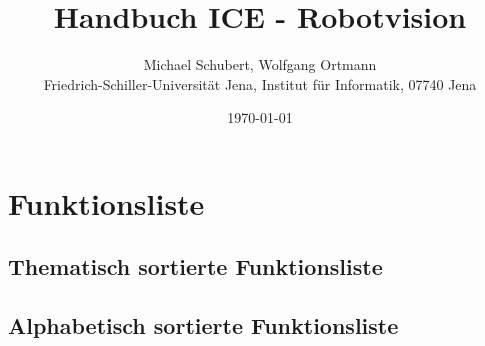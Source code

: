 \documentclass[10pt,titlepage]{article}
\begin{document}
\title{Handbuch ICE - Robotvision}
\author{Michael Schubert, Wolfgang Ortmann\\
Friedrich-Schiller-Universität Jena, Institut für Informatik, 07740 Jena}
\date{\today}
\maketitle

\tableofcontents
\newpage

\newpage

\newpage

\newpage

\newpage

\newpage

\newpage

\newpage

\newpage

\newpage

\newpage

\section{Funktionsliste}
\subsection{Thematisch sortierte Funktionsliste}


\newpage

\subsection{Alphabetisch sortierte Funktionsliste}



\pagebreak
\end{document}
